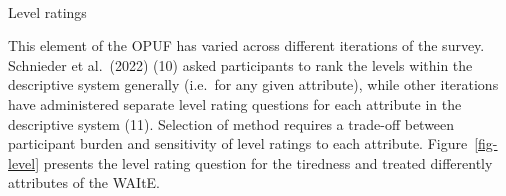 \documentclass[
  letterpaper,
  DIV=11,
  numbers=noendperiod]{scrartcl}
\makeatletter
\let\oldparagraph\paragraph
\renewcommand{\paragraph}{
    \@ifstar
      \xxxParagraphStar
      \xxxParagraphNoStar
  }
\newcommand{\xxxParagraphStar}[1]{\oldparagraph*{#1}\mbox{}}
\newcommand{\xxxParagraphNoStar}[1]{\oldparagraph{#1}\mbox{}}
\makeatother
\begin{document}
\paragraph{Level ratings}\label{level-ratings}

This element of the OPUF has varied across different iterations of the
survey. Schnieder et al.~(2022) (10) asked participants to rank the
levels within the descriptive system generally (i.e.~for any given
attribute), while other iterations have administered separate level
rating questions for each attribute in the descriptive system (11).
Selection of method requires a trade-off between participant burden and
sensitivity of level ratings to each attribute. Figure~\ref{fig-level}
presents the level rating question for the tiredness and treated
differently attributes of the WAItE.
\end{document}
